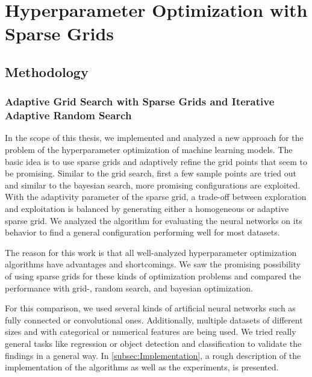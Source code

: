 
\chapter{Hyperparameter Optimization with Sparse Grids}\label{chapter:main_part}

\section{Methodology}

\subsection{Adaptive Grid Search with Sparse Grids and Iterative Adaptive Random Search}

In the scope of this thesis, we implemented and analyzed a new approach for the problem of the hyperparameter optimization of machine learning models. The basic idea is to use sparse grids and adaptively refine the grid points that seem to be promising. Similar to the grid search, first a few sample points are tried out and similar to the bayesian search, more promising configurations are exploited. With the adaptivity parameter of the sparse grid, a trade-off between exploration and exploitation is balanced by generating either a homogeneous or adaptive sparse grid. We analyzed the algorithm for evaluating the neural networks on its behavior to find a general configuration performing well for most datasets. \newline 

The reason for this work is that all well-analyzed hyperparameter optimization algorithms have advantages and shortcomings. We saw the promising possibility of using sparse grids for these kinds of optimization problems and compared the performance with grid-, random search, and bayesian optimization. \newline 

For this comparison, we used several kinds of artificial neural networks such as fully connected or convolutional ones. Additionally, multiple datasets of different sizes and with categorical or numerical features are being used. We tried really general tasks like regression or object detection and classification to validate the findings in a general way. In \ref{subsec:Implementation}, a rough description of the implementation of the algorithms as well as the experiments, is presented.

